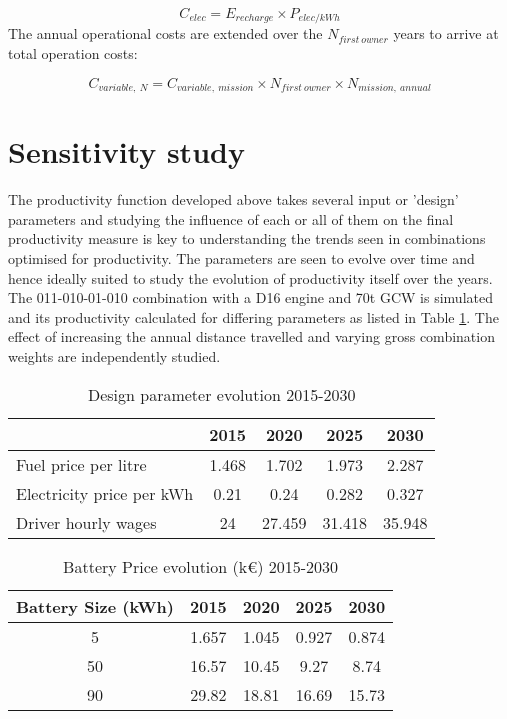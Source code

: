 \documentclass[ExampleMasters.tex]{subfiles}
\begin{document}
			\begin{equation}
				C_{elec} = E_{recharge} \times P_{elec/kWh}
			\end{equation}
			The annual operational costs are extended over the $N_{first\ owner}$ years to arrive at total operation costs:

			\begin{equation}
				C_{variable,\ N} = C_{variable,\ mission} \times N_{first\ owner} \times N_{mission,\ annual}
			\end{equation}

	\section{Sensitivity study}
	The productivity function developed above takes several input or 'design' parameters and studying the influence of each or all of them on the final productivity measure is key to understanding the trends seen in combinations optimised for productivity. The parameters are seen to evolve over time and hence ideally suited to study the evolution of productivity itself over the years. The 011-010-01-010 combination with a D16 engine and 70t GCW is simulated and its productivity calculated for differing parameters as listed in Table \ref{table:ParameterSensitivity}. The effect of increasing the annual distance travelled and varying gross combination weights are independently studied. \\ 

	\begin{table}[ht]
			\centering 
			\begin{tabular}{l c c c c}
				\cline{2-5}
				\ & 2015 & 2020 & 2025 & 2030\\ 
				\hline
				Fuel price per litre & 1.468 & 1.702 & 1.973 & 2.287\\
				Electricity price per kWh & 0.21 & 0.24 & 0.282 & 0.327\\
			    Driver hourly wages  & 24 & 27.459 & 31.418 & 35.948\\
				\hline 
			\end{tabular}
			\caption{Design parameter evolution 2015-2030 \cite{ElementEnergy}} 
			\label{table:ParameterSensitivity} 
		\end{table}

	\begin{table}[ht]
		\centering 
		\begin{tabular}{c c c c c}
			\hline
			Battery Size (kWh) & 2015 & 2020 & 2025 & 2030\\ 
			\hline
			5 & 1.657 & 1.045 & 0.927 & 0.874\\
			50 & 16.57 & 10.45 & 9.27 & 8.74\\
			90 & 29.82 & 18.81 & 16.69 & 15.73\\
			\hline 
		\end{tabular}
		\caption{Battery Price evolution (k\euro) 2015-2030 \cite{ElementEnergy}} 
		\label{table:ParameterSensitivityBattery} 
	\end{table}
\end{document}
